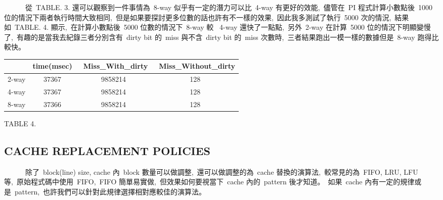 \documentclass{article}
\begin{document}
\begin{CJK*}{UTF8}{bsmi}
\begin{multicols}{2}
\begin{flushleft}
    \ \ \ \ \ \ 從\ TABLE. 3. 還可以觀察到一件事情為\ 8-way 似乎有一定的潛力可以比\ 4-way 有更好的效能,\
    儘管在\ PI 程式計算小數點後\ 1000 位的情況下兩者執行時間大致相同,\
    但是如果要探討更多位數的話也許有不一樣的效果,\
    因此我多測試了執行\ 5000 次的情況,\
    結果如\ TABLE. 4. 顯示,\
    在計算小數點後\ 5000 位數的情況下\ 8-way 較 \ 4-way 還快了一點點,\
    另外\ 2-way 在計算\ 5000 位的情況下明顯變慢了,\
    有趣的是當我去紀錄三者分別含有\ dirty bit 的\ miss 與不含\ dirty bit 的\ miss 次數時,\
    三者結果跑出一模一樣的數據但是\ 8-way 跑得比較快。
\end{flushleft}

\begin{center}
    \begin{tabular}{|| c c c c ||} 
     \hline
      & time(msec) & \ Miss\_With\_dirty & \ Miss\_Without\_dirty \\ [2ex] 
     \hline\hline
     2-way & 37367 & 9858214 & 128 \\ 
     \hline
     4-way & 37367 & 9858214 & 128 \\ 
     \hline
     8-way & 37366 & 9858214 & 128 \\ 
     \hline
    \end{tabular}
\end{center}

\begin{center}
    \small{TABLE 4.}\\
\end{center}


\begin{center}
    \section*{CACHE REPLACEMENT POLICIES}
\end{center}

\begin{flushleft}
    \ \ \ \ \ \ 除了\ block(line) size, cache 內\ block 數量可以做調整,\
    還可以做調整的為\ cache 替換的演算法,\
    較常見的為\ FIFO, LRU, LFU 等,\
    原始程式碼中使用\ FIFO,\
    FIFO 簡單易實做,\
    但效果如何要視當下\ cache 內的\ pattern 後才知道。\
    如果\ cache 內有一定的規律或是\ pattern,\
    也許我們可以針對此規律選擇相對應較佳的演算法。\
\end{flushleft}

\newpage


\end{multicols}
\end{CJK*}
\end{document}
